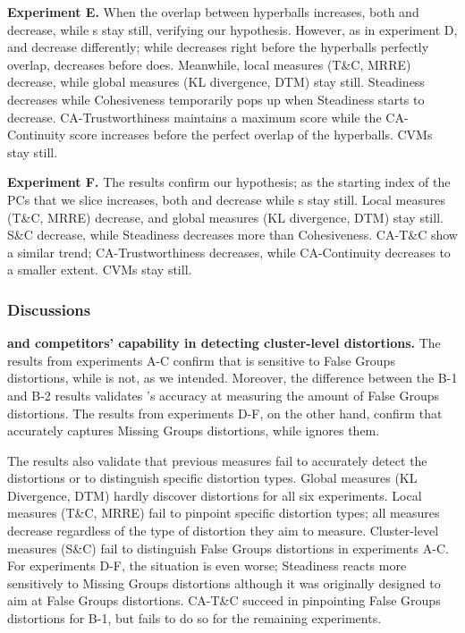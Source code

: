 \noindent
\textbf{Experiment E.} When the overlap between hyperballs increases, both \lc [DSC] and \lc [\CHb{}] decrease, while \lt{}s stay still, verifying our hypothesis. However, as in experiment D, \lc [DSC] and \lc [\CHb{}] decrease differently; while \lc [DSC] decreases right before the hyperballs perfectly overlap, \lc [\CHb{}] decreases before \lc [DSC] does. 
Meanwhile, local measures (T\&C, MRRE) decrease, while global measures (KL divergence, DTM) stay still.
Steadiness decreases while Cohesiveness temporarily pops up when Steadiness starts to decrease. 
CA-Trustworthiness maintains a maximum score while the CA-Continuity score increases before the perfect overlap of the hyperballs. CVMs stay still. 


\noindent
\textbf{Experiment F.} The results confirm our hypothesis;  as the starting index of the PCs that we slice increases, both \lc [DSC] and \lc [\CHb{}] decrease while \lt{}s stay still. 
Local measures (T\&C, MRRE) decrease, and global measures (KL divergence, DTM) stay still.
S\&C decrease, while Steadiness decreases more than Cohesiveness.
CA-T\&C show a similar trend; CA-Trustworthiness decreases, while CA-Continuity decreases to a smaller extent. CVMs stay still.

\subsubsection{Discussions}

\noindent
\textbf{\ltc and competitors' capability in detecting cluster-level distortions.}
The results from experiments A-C confirm that \lt is sensitive to False Groups distortions, while \lc is not, as we intended. 
Moreover, the difference between the B-1 and B-2 results validates \lt{}'s accuracy at measuring the amount of False Groups distortions.
The results from experiments D-F, on the other hand, confirm that \lc accurately captures Missing Groups distortions, while \lt ignores them.

The results also validate that previous measures fail to accurately detect the distortions or to distinguish specific distortion types.
Global measures (KL Divergence, DTM) hardly discover distortions for all six experiments. 
Local measures (T\&C, MRRE) fail to pinpoint specific distortion types; all measures decrease regardless of the type of distortion they aim to measure.
Cluster-level measures (S\&C) fail to distinguish False Groups distortions in experiments A-C. 
For experiments D-F, the situation is even worse; Steadiness reacts more sensitively to Missing Groups distortions although it was originally designed to aim at False Groups distortions.
CA-T\&C succeed in pinpointing False Groups distortions for B-1, but fails to do so for the remaining experiments. 

